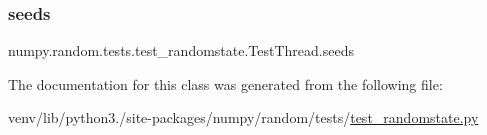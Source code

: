 \subsubsection{\texorpdfstring{seeds}{seeds}}
{\footnotesize\ttfamily numpy.\+random.\+tests.\+test\+\_\+randomstate.\+Test\+Thread.\+seeds}



The documentation for this class was generated from the following file\+:\begin{DoxyCompactItemize}
\item 
venv/lib/python3./site-\/packages/numpy/random/tests/\hyperlink{test__randomstate_8py}{test\+\_\+randomstate.\+py}\end{DoxyCompactItemize}
